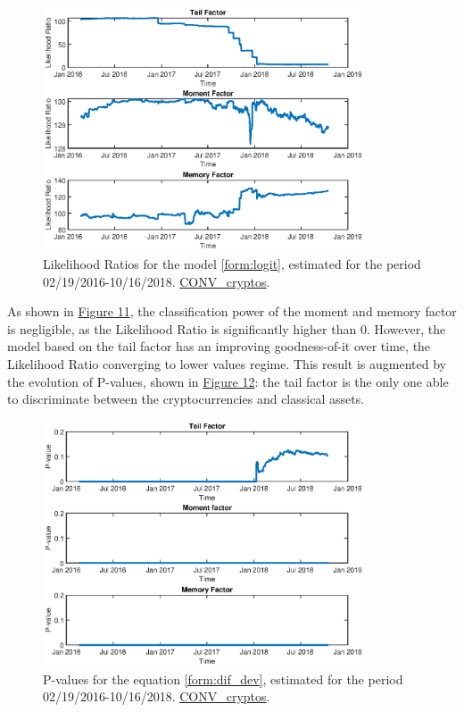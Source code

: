 \begin{figure}[H]
	\centering
	\includegraphics[width=0.85\textwidth]{Fig/figure_11}
	\caption{Likelihood Ratios for the model \ref{form:logit}, estimated for the period 02/19/2016-10/16/2018. \href{https://github.com/QuantLet/Genus_proximum_cryptos/tree/master/CONV_cryptos}{CONV\_cryptos}.}
	\label{fig:figure_11}
\end{figure}
 As shown in \hyperref[fig:figure_11]{Figure 11}, the classification power of the moment and memory factor is negligible, as the Likelihood Ratio is significantly higher than 0.
 However, the model based on the tail factor has an improving goodness-of-it over time, the Likelihood Ratio converging to lower values regime. This result is augmented by the evolution of P-values, shown in \hyperref[fig:figure_12]{Figure 12}: the tail factor is the only one able to discriminate between the cryptocurrencies and classical assets.
 \begin{figure}[H]
 	\centering
 	\includegraphics[width=0.85\textwidth]{Fig/figure_12}
 	\caption{P-values for the equation \ref{form:dif_dev}, estimated for the period 02/19/2016-10/16/2018. \href{https://github.com/QuantLet/Genus_proximum_cryptos/tree/master/CONV_cryptos}{CONV\_cryptos}.}
 	\label{fig:figure_12}
 \end{figure}


